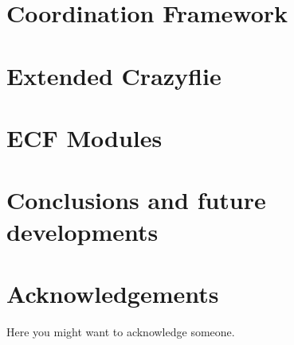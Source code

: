 \documentclass{Configuration_Files/PoliMi3i_thesis}
\begin{document}
\chapter{Coordination Framework}
\label{ch:coordination}


\chapter{Extended Crazyflie}
\label{ch:ecf}


\chapter{ECF Modules}
\label{ch:modules}


\chapter{Conclusions and future developments}
\label{ch:conclusions}





\cleardoublepage
{} %



\listoffigures

\listoftables

\lstlistoflistings

\chapter*{Acknowledgements}
Here you might want to acknowledge someone.

\cleardoublepage
\end{document}
